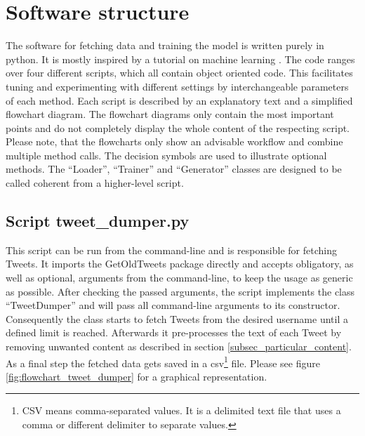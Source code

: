 \documentclass[conference]{IEEEtran}
\begin{document}
\section{Software structure}

The software for fetching data and training the model is written purely in python. It is mostly inspired by a tutorial on machine learning \cite{tutrob}. The code ranges over four different scripts, which all contain object oriented code. This facilitates tuning and experimenting with different settings by interchangeable parameters of each method. Each script is described by an explanatory text and a simplified flowchart diagram. The flowchart diagrams only contain the most important points and do not completely display the whole content of the respecting script. Please note, that the flowcharts only show an advisable workflow and combine multiple method calls. The decision symbols are used to illustrate optional methods. The ``Loader'', ``Trainer'' and ``Generator'' classes are designed to be called coherent from a higher-level script.

\subsection{Script tweet\_dumper.py}

This script can be run from the command-line and is responsible for fetching Tweets. It imports the GetOldTweets package directly and accepts obligatory, as well as optional, arguments from the command-line, to keep the usage as generic as possible. After checking the passed arguments, the script implements the class ``TweetDumper'' and will pass all command-line arguments to its constructor. Consequently the class starts to fetch Tweets from the desired username until a defined limit is reached. Afterwards it pre-processes the text of each Tweet by removing unwanted content as described in section \ref{subsec_particular_content}. As a final step the fetched data gets saved in a csv\footnote{CSV means comma-separated values. It is a delimited text file that uses a comma or different delimiter to separate values.} file. Please see figure \ref{fig:flowchart_tweet_dumper} for a graphical representation.
\end{document}
